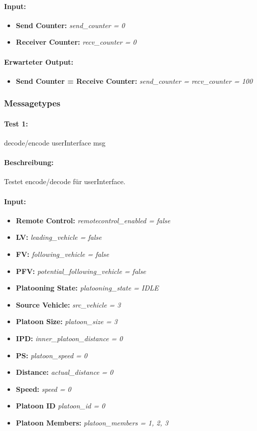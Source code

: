\documentclass[a4paper, 12pt, titlepage]{scrartcl}
\begin{document}
{			\paragraph{Input:}
			\begin{itemize} \itemsep-0.5em
				\item \textbf{Send Counter:} \emph{send\_counter = 0}
				\item \textbf{Receiver Counter:} \emph{recv\_counter = 0}
			\end{itemize}
			\paragraph{Erwarteter Output:}
			\begin{itemize} \itemsep-0.5em
				\item \textbf{Send Counter = Receive Counter:} \emph{send\_counter = recv\_counter 	= 100}
			\end{itemize}


			\subsubsection{Messagetypes}
			\label{message_types}
			\paragraph{Test 1:}{decode/encode userInterface msg}
			\paragraph{Beschreibung:} Testet encode/decode für userInterface.
			\paragraph{Input:}
			\begin{itemize} \itemsep-0.5em
				\item \textbf{Remote Control:} \emph{remotecontrol\_enabled = false}
				\item \textbf{LV:} \emph{leading\_vehicle = false}
				\item \textbf{FV:} \emph{following\_vehicle = false}
				\item \textbf{PFV:} \emph{potential\_following\_vehicle = false}
				\item \textbf{Platooning State:} \emph{platooning\_state = IDLE}
				\item \textbf{Source Vehicle:} \emph{src\_vehicle = 3}
				\item \textbf{Platoon Size:} \emph{platoon\_size = 3}
				\item \textbf{IPD:} \emph{inner\_platoon\_distance = 0}
				\item \textbf{PS:} \emph{platoon\_speed = 0}
				\item \textbf{Distance:} \emph{actual\_distance = 0}
				\item \textbf{Speed:} \emph{speed = 0}
				\item \textbf{Platoon ID} \emph{platoon\_id = 0}
				\item \textbf{Platoon Members:} \emph{platoon\_members = {1, 2, 3}}
			\end{itemize}
}
\end{document}
